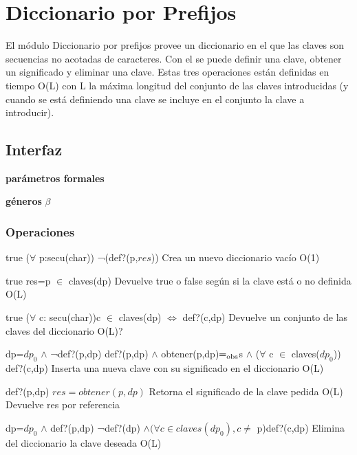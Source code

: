 \section{Diccionario por Prefijos}

El m\'odulo Diccionario por prefijos provee un diccionario en el que las claves son secuencias no acotadas de caracteres. Con el se puede definir una clave, obtener un significado y eliminar una clave.
Estas tres operaciones est\'an definidas en tiempo O(L) con L la m\'axima longitud del conjunto de las claves introducidas (y cuando se est\'a definiendo una clave se incluye en el conjunto la clave a introducir).

\subsection{Interfaz}

  \textbf{par\'ametros formales}
  
  \textbf{g\'eneros} $\beta$\\
 





\subsubsection*{Operaciones}

{true}
{($\forall$ p:secu(char)) ¬(def?(p,$res$))}
{Crea un nuevo diccionario vac\'io}
{O(1)}
{}


{true}
{res=p $\in$ claves(dp)}
{Devuelve true o false seg\'un si la clave est\'a o no definida}
{O(L)}
{}

{true}
{($\forall$ c: secu(char))c $\in$ claves(dp) $\iff$ def?(c,dp)}
{Devuelve un conjunto de las claves del diccionario}
{O(L)?}
{}

{dp=$dp_0$ $\land$ ¬def?(p,dp)}
{def?(p,dp) $\land$ obtener(p,dp)$=_{\mathrm{obs}}$s $\land$ ($\forall$ c $\in$ claves($dp_0$)) def?(c,dp)}
{Inserta una nueva clave con su significado en el diccionario}
{O(L)}
{}


{def?(p,dp)}
{$res = obtener(p,dp)$}
{Retorna el significado de la clave pedida}
{O(L)}
{Devuelve res por referencia}


{dp=$dp_0$ $\land$ def?(p,dp)}
{¬def?(dp) $\land (\forall c \in claves(dp_0),c\neq$ p)def?(c,dp)}
{Elimina del diccionario la clave deseada}
{O(L)}
{}
